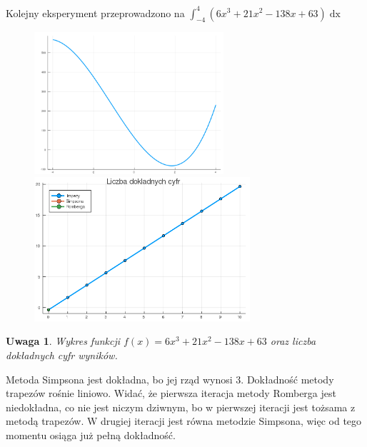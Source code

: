 \documentclass[11pt,wide]{article}
\newtheorem{remark}{Uwaga}
\begin{document}
Kolejny eksperyment przeprowadzono na \(\displaystyle \int_{-4}^{4} (6x^3 + 21x^2 - 138x + 63)\mathop{dx} \)
\begin{figure}[h!]
	\includegraphics[width=70mm,scale=0.5]{wiel3}
	\includegraphics[width=80mm,scale=0.5]{wiel_blad3}
\end{figure}
\begin{remark}
\centering
Wykres funkcji \(f(x) = 6x^3 + 21x^2 - 138x + 63 \) oraz liczba dokładnych cyfr wyników.
\end{remark}
Metoda Simpsona jest dokładna, bo jej rząd wynosi 3. Dokładność metody trapezów rośnie liniowo. Widać, że pierwsza iteracja metody Romberga jest niedokładna, co nie jest niczym dziwnym, bo w pierwszej iteracji jest tożsama z metodą trapezów. W drugiej iteracji jest równa metodzie Simpsona, więc od tego momentu osiąga już pełną dokładność. \\ \\
\end{document}
